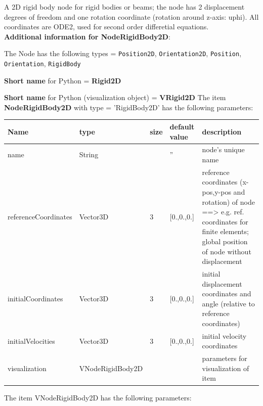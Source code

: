 %
\newpage

\label{sec:item:NodeRigidBody2D}
A 2D rigid body node for rigid bodies or beams; the node has 2 displacement degrees of freedom and one rotation coordinate (rotation around z-axis: uphi). All coordinates are ODE2, used for second order differetial equations.\vspace{12pt}
 \\{\bf Additional information for NodeRigidBody2D}:
\bi
  \item The Node has the following types = \texttt{Position2D}, \texttt{Orientation2D}, \texttt{Position}, \texttt{Orientation}, \texttt{RigidBody}
  \item {\bf Short name} for Python = {\bf Rigid2D}  \item {\bf Short name} for Python (visualization object) = {\bf VRigid2D}\ei
\vspace{12pt} \noindent The item {\bf NodeRigidBody2D} with type = 'RigidBody2D' has the following parameters:\vspace{-1cm}\\ 
\begin{center}
  \footnotesize
  \begin{longtable}{| p{4.5cm} | p{2.5cm} | p{0.5cm} | p{2.5cm} | p{6cm} |}
    \hline
    \bf Name & \bf type & \bf size & \bf default value & \bf description \\ \hline
    name &     String &      &     '' &     node's unique name\\ \hline
    referenceCoordinates &     Vector3D &     3 &     [0.,0.,0.] &     reference coordinates (x-pos,y-pos and rotation) of node ==> e.g. ref. coordinates for finite elements; global position of node without displacement\\ \hline
    initialCoordinates &     Vector3D &     3 &     [0.,0.,0.] &     initial displacement coordinates and angle (relative to reference coordinates)\\ \hline
    initialVelocities &     Vector3D &     3 &     [0.,0.,0.] &     initial velocity coordinates\\ \hline
    visualization & VNodeRigidBody2D & & & parameters for visualization of item \\ \hline
	  \end{longtable}
	\end{center}
The item VNodeRigidBody2D has the following parameters:\vspace{-1cm}\\ 
